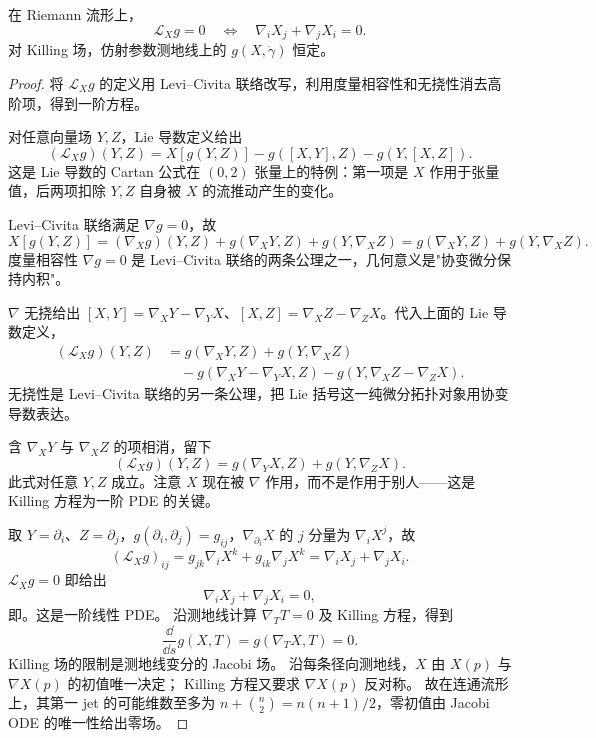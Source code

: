\begin{proposition}
在 Riemann 流形上，\[\mathcal L_Xg=0\quad\Longleftrightarrow\quad\nabla_iX_j+\nabla_jX_i=0.\]对 Killing 场，仿射参数测地线上的 $g(X,\dot\gamma)$ 恒定。
\end{proposition}

\begin{proof}
将 $\mathcal L_Xg$ 的定义用 Levi--Civita 联络改写，利用度量相容性和无挠性消去高阶项，得到一阶方程。

对任意向量场 $Y,Z$，Lie 导数定义给出
\begin{equation*}
 (\mathcal L_Xg)(Y,Z)
 =X[g(Y,Z)]-g([X,Y],Z)-g(Y,[X,Z]).
\end{equation*}
这是 Lie 导数的 Cartan 公式在 $(0,2)$ 张量上的特例：第一项是 $X$ 作用于张量值，后两项扣除 $Y,Z$ 自身被 $X$ 的流推动产生的变化。

Levi--Civita 联络满足 $\nabla g=0$，故
\begin{equation*}
 X[g(Y,Z)]
 =(\nabla_Xg)(Y,Z)+g(\nabla_XY,Z)+g(Y,\nabla_XZ)
 =g(\nabla_XY,Z)+g(Y,\nabla_XZ).
\end{equation*}
度量相容性 $\nabla g=0$ 是 Levi--Civita 联络的两条公理之一，几何意义是"协变微分保持内积"。

$\nabla$ 无挠给出 $[X,Y]=\nabla_XY-\nabla_YX$、$[X,Z]=\nabla_XZ-\nabla_ZX$。代入上面的 Lie 导数定义，
\begin{align*}
 (\mathcal L_Xg)(Y,Z)
 &=g(\nabla_XY,Z)+g(Y,\nabla_XZ)\\
 &\quad -g(\nabla_XY-\nabla_YX,Z)-g(Y,\nabla_XZ-\nabla_ZX).
\end{align*}
无挠性是 Levi--Civita 联络的另一条公理，把 Lie 括号这一纯微分拓扑对象用协变导数表达。

含 $\nabla_XY$ 与 $\nabla_XZ$ 的项相消，留下
\begin{equation*}
 (\mathcal L_Xg)(Y,Z)
 =g(\nabla_YX,Z)+g(Y,\nabla_ZX).
\end{equation*}
此式对任意 $Y,Z$ 成立。注意 $X$ 现在被 $\nabla$ 作用，而不是作用于别人——这是 Killing 方程为一阶 PDE 的关键。

取 $Y=\partial_i$、$Z=\partial_j$，$g(\partial_i,\partial_j)=g_{ij}$，$\nabla_{\partial_i}X$ 的 $j$ 分量为 $\nabla_iX^j$，故
\begin{equation*}
 (\mathcal L_Xg)_{ij}
 =g_{jk}\nabla_iX^k+g_{ik}\nabla_jX^k
 =\nabla_iX_j+\nabla_jX_i.
\end{equation*}
$\mathcal L_Xg=0$ 即给出
\begin{equation}\label{eq:math-dg-synthesis-killing-eq}
{\nabla_iX_j+\nabla_jX_i=0,}
\end{equation}
即。这是一阶线性 PDE。
沿测地线计算 $\nabla_TT=0$ 及 Killing 方程，得到
\[
\frac{\dd}{\dd s}g(X,T)=g(\nabla_TX,T)=0.
\]
Killing 场的限制是测地线变分的 Jacobi 场。
沿每条径向测地线，$X$ 由 $X(p)$ 与 $\nabla X(p)$ 的初值唯一决定；
Killing 方程又要求 $\nabla X(p)$ 反对称。
故在连通流形上，其第一 jet 的可能维数至多为
$n+\binom n2=n(n+1)/2$，零初值由 Jacobi ODE 的唯一性给出零场。




\end{proof}

